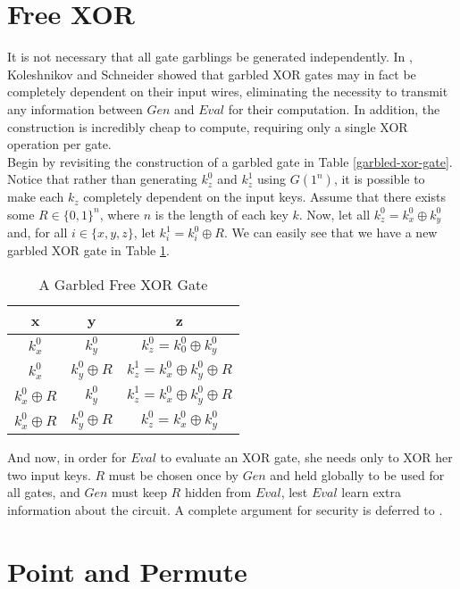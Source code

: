 \documentclass{article}
\begin{document}
\section{Free XOR}

It is not necessary that all gate garblings be generated independently. In \cite{freeXOR}, Koleshnikov and Schneider showed that garbled XOR gates may in fact be completely dependent on their input wires, eliminating the necessity to transmit any information between $Gen$ and $Eval$ for their computation. In addition, the construction is incredibly cheap to compute, requiring only a single XOR operation per gate. \\

Begin by revisiting the construction of a garbled gate in Table \ref{garbled-xor-gate}. Notice that rather than generating $k_{z}^{0}$ and $k_{z}^{1}$ using $G(1^n)$, it is possible to make each $k_z$ completely dependent on the input keys. Assume that there exists some $R \in \{0,1\}^n$, where $n$ is the length of each key $k$. Now, let all $k_{z}^{0} = k_{x}^{0} \oplus k_{y}^{0}$ and, for all $i \in \{x,y,z\}$, let $k_{i}^{1} = k_{i}^{0} \oplus R$. We can easily see that we have a new garbled XOR gate in Table \ref{garbled-freexor-gate}. \\

\begin{table}[h]
\centering
\begin{tabular}{c c | c}
	x & y & z \\ \hline
	$k_x^0$ & $k_y^0$ & $k_z^0 = k_0^0 \oplus k_y^0$ \\
	$k_x^0$ & $k_y^0 \oplus R$ & $k_z^1 = k_x^0 \oplus k_y^0 \oplus R$ \\
	$k_x^0 \oplus R$ & $k_y^0$ & $k_z^1 = k_x^0 \oplus k_y^0 \oplus R$ \\
	$k_x^0 \oplus R$ & $k_y^0 \oplus R $ & $k_z^0 = k_x^0 \oplus k_y^0$ \\
\end{tabular}
\caption{A Garbled Free XOR Gate}
\label{garbled-freexor-gate}
\end{table}

And now, in order for $Eval$ to evaluate an XOR gate, she needs only to XOR her two input keys. $R$ must be chosen once by $Gen$ and held globally to be used for all gates, and $Gen$ must keep $R$ hidden from $Eval$, lest $Eval$ learn extra information about the circuit. A complete argument for security is deferred to \cite{freeXOR}.

\section{Point and Permute}
\label{point-and-permute}
\end{document}
